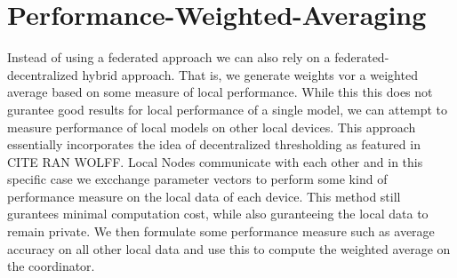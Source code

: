 \section{Performance-Weighted-Averaging}
Instead of using a federated approach we can also rely on a federated-decentralized hybrid approach. 
That is, we generate weights vor a weighted average based on some measure of local performance.
While this this does not gurantee good results for local performance of a single model, we can attempt to measure performance of local models on other local devices.
This approach essentially incorporates the idea of decentralized thresholding as featured in CITE RAN WOLFF.
Local Nodes communicate with each other and in this specific case we excchange parameter vectors to perform some kind of performance measure on the local data of each device.
This method still gurantees minimal computation cost, while also guranteeing the local data to remain private.
We then formulate some performance measure such as average accuracy on all other local data and use this to compute the weighted average on the coordinator.
